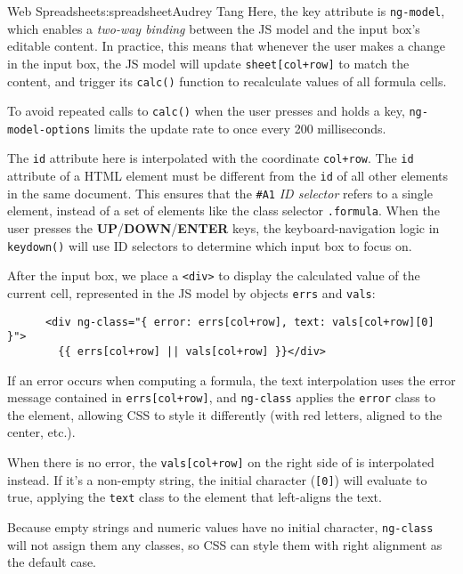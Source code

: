 \begin{aosachapter}{Web Spreadsheet}{s:spreadsheet}{Audrey Tang}
Here, the key attribute is \texttt{ng-model}, which enables a
\emph{two-way binding} between the JS model and the input box's editable
content. In practice, this means that whenever the user makes a change
in the input box, the JS model will update \texttt{sheet{[}col+row{]}}
to match the content, and trigger its \texttt{calc()} function to
recalculate values of all formula cells.

To avoid repeated calls to \texttt{calc()} when the user presses and
holds a key, \texttt{ng-model-options} limits the update rate to once
every 200 milliseconds.

The \texttt{id} attribute here is interpolated with the coordinate
\texttt{col+row}. The \texttt{id} attribute of a HTML element must be
different from the \texttt{id} of all other elements in the same
document. This ensures that the \texttt{\#A1} \emph{ID selector} refers
to a single element, instead of a set of elements like the class
selector \texttt{.formula}. When the user presses the
\textbf{UP}/\textbf{DOWN}/\textbf{ENTER} keys, the keyboard-navigation
logic in \texttt{keydown()} will use ID selectors to determine which
input box to focus on.

After the input box, we place a \texttt{\textless{}div\textgreater{}} to
display the calculated value of the current cell, represented in the JS
model by objects \texttt{errs} and \texttt{vals}:

\begin{verbatim}
      <div ng-class="{ error: errs[col+row], text: vals[col+row][0] }">
        {{ errs[col+row] || vals[col+row] }}</div>
\end{verbatim}

If an error occurs when computing a formula, the text interpolation uses
the error message contained in \texttt{errs{[}col+row{]}}, and
\texttt{ng-class} applies the \texttt{error} class to the element,
allowing CSS to style it differently (with red letters, aligned to the
center, etc.).

When there is no error, the \texttt{vals{[}col+row{]}} on the right side
of \texttt{\textbar{}\textbar{}} is interpolated instead. If it's a
non-empty string, the initial character (\texttt{{[}0{]}}) will evaluate
to true, applying the \texttt{text} class to the element that
left-aligns the text.

Because empty strings and numeric values have no initial character,
\texttt{ng-class} will not assign them any classes, so CSS can style
them with right alignment as the default case.


\end{aosachapter}
